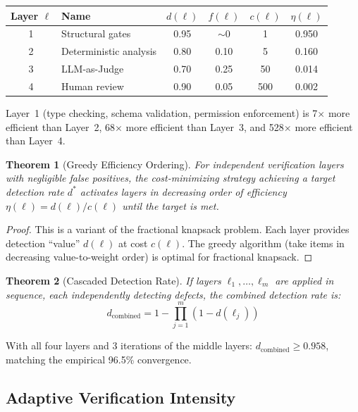 \documentclass[11pt, a4paper, copyright]{googledeepmind}
\newtheorem{theorem}{Theorem}[section]
\begin{document}
\begin{center}
\begin{tabular}{clcccc}
\toprule
Layer $\ell$ & Name & $d(\ell)$ & $f(\ell)$ & $c(\ell)$ & $\eta(\ell)$ \\
\midrule
1 & Structural gates & 0.95 & ${\sim}0$ & 1 & 0.950 \\
2 & Deterministic analysis & 0.80 & 0.10 & 5 & 0.160 \\
3 & LLM-as-Judge & 0.70 & 0.25 & 50 & 0.014 \\
4 & Human review & 0.90 & 0.05 & 500 & 0.002 \\
\bottomrule
\end{tabular}
\end{center}

Layer~1 (type checking, schema validation, permission enforcement) is 7$\times$ more efficient than Layer~2, 68$\times$ more efficient than Layer~3, and 528$\times$ more efficient than Layer~4.

\begin{theorem}[Greedy Efficiency Ordering]
For independent verification layers with negligible false positives, the cost-minimizing strategy achieving a target detection rate $d^*$ activates layers in decreasing order of efficiency $\eta(\ell) = d(\ell)/c(\ell)$ until the target is met.
\end{theorem}

\begin{proof}
This is a variant of the fractional knapsack problem.
Each layer provides detection ``value'' $d(\ell)$ at cost $c(\ell)$.
The greedy algorithm (take items in decreasing value-to-weight order) is optimal for fractional knapsack.
\end{proof}

\begin{theorem}[Cascaded Detection Rate]
If layers $\ell_1, \ldots, \ell_m$ are applied in sequence, each independently detecting defects, the combined detection rate is:
\begin{equation}
d_{\text{combined}} = 1 - \prod_{j=1}^{m} (1 - d(\ell_j))
\end{equation}
\end{theorem}

With all four layers and 3 iterations of the middle layers: $d_{\text{combined}} \geq 0.958$, matching the empirical 96.5\% convergence.

\subsection{Adaptive Verification Intensity}
\end{document}
